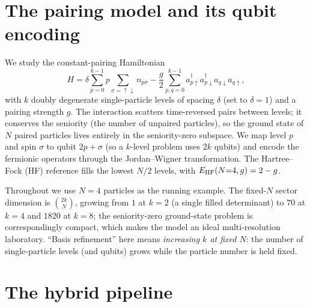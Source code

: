 \documentclass[11pt]{article}
\begin{document}
\section{The pairing model and its qubit encoding}
We study the constant-pairing Hamiltonian
\begin{equation}
  H=\delta\sum_{p=0}^{k-1} p\sum_{\sigma=\uparrow\downarrow} n_{p\sigma}
   -\frac{g}{2}\sum_{p,q=0}^{k-1} a^\dagger_{p\uparrow}a^\dagger_{p\downarrow}
     a_{q\downarrow}a_{q\uparrow},
  \label{eq:H}
\end{equation}
with $k$ doubly degenerate single-particle levels of spacing $\delta$ (set to
$\delta=1$) and a pairing strength $g$.  The interaction scatters time-reversed
pairs between levels; it conserves the seniority (the number of unpaired particles),
so the ground state of $N$ paired particles lives entirely in the seniority-zero
subspace.  We map level $p$ and spin $\sigma$ to qubit $2p+\sigma$ (so a $k$-level
problem uses $2k$ qubits) and encode the fermionic operators through the
Jordan--Wigner transformation.  The Hartree--Fock (HF) reference fills the lowest
$N/2$ levels, with $E_{\rm HF}(N{=}4,g)=2-g$.

Throughout we use $N=4$ particles as the running example.  The fixed-$N$ sector
dimension is $\binom{2k}{N}$, growing from $1$ at $k=2$ (a single filled
determinant) to $70$ at $k=4$ and $1820$ at $k=8$; the seniority-zero ground-state
problem is correspondingly compact, which makes the model an ideal multi-resolution
laboratory.  ``Basis refinement'' here means \emph{increasing $k$ at fixed $N$}: the
number of single-particle levels (and qubits) grows while the particle number is
held fixed.

\section{The hybrid pipeline}
\end{document}
